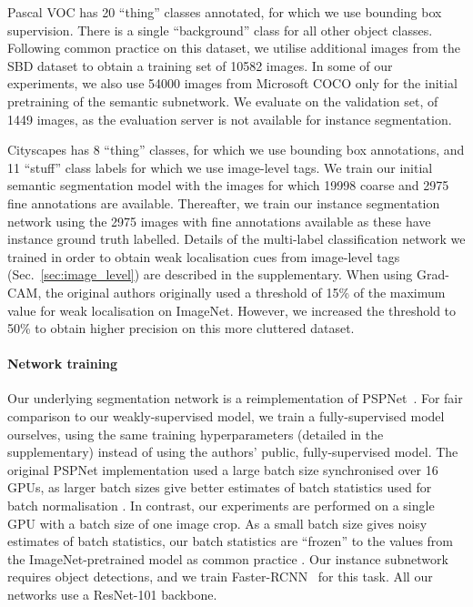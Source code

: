 \documentclass[runningheads]{llncs}
\begin{document}
Pascal VOC has 20 ``thing'' classes annotated, for which we use bounding box supervision. There is a single ``background'' class for all other object classes.
Following common practice on this dataset, we utilise additional images from the SBD dataset \cite{hariharan_2011} to obtain a training set of 10582 images.
In some of our experiments, we also use 54000 images from Microsoft COCO \cite{lin_2014} only for the initial pretraining of the semantic subnetwork.
We evaluate on the validation set, of 1449 images, as the evaluation server is not available for instance segmentation.

Cityscapes has 8 ``thing'' classes, for which we use bounding box annotations, and 11 ``stuff'' class labels for which we use image-level tags.
We train our initial semantic segmentation model with the images for which 19998 coarse and 2975 fine annotations are available.
Thereafter, we train our instance segmentation network using the 2975 images with fine annotations available as these have instance ground truth labelled.
Details of the multi-label classification network we trained in order to obtain weak localisation cues from image-level tags (Sec.~\ref{sec:image_level}) are described in the supplementary.
When using Grad-CAM, the original authors originally used a threshold of 15\% of the maximum value for weak localisation on ImageNet.
However, we increased the threshold to 50\% to obtain higher precision on this more cluttered dataset.

\paragraph{Network training}
Our underlying segmentation network is a reimplementation of PSPNet~\cite{zhao_cvpr_2017}.
For fair comparison to our weakly-supervised model, we train a fully-supervised model ourselves, using the same training hyperparameters (detailed in the supplementary) instead of using the authors' public, fully-supervised model.
The original PSPNet implementation \cite{zhao_cvpr_2017} used a large batch size synchronised over 16 GPUs, as larger batch sizes give better estimates of batch statistics used for batch normalisation \cite{zhao_cvpr_2017,chen_arxiv_2017}.
In contrast, our experiments are performed on a single GPU with a batch size of one  image crop.
As a small batch size gives noisy estimates of batch statistics, our batch statistics are ``frozen'' to the values from the ImageNet-pretrained model as common practice \cite{chen_arxiv_2016,huang_cvpr_2017}.
Our instance subnetwork requires object detections, and we train Faster-RCNN~\cite{ren_2015} for this task.
All our networks use a ResNet-101 \cite{he_cvpr_2016} backbone.
\end{document}
